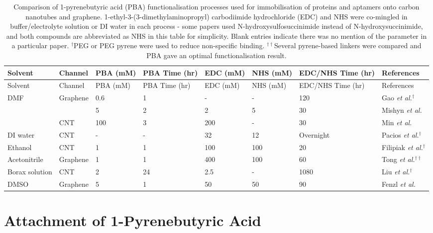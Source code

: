 \documentclass[
  a4paper,
]{scrbook}
\begin{document}
\hypertarget{tbl-pba-functionalisation}{}
\begin{longtable}[]{@{}llllllll@{}}
\caption{\label{tbl-pba-functionalisation}Comparison of 1-pyrenebutyric
acid (PBA) functionalisation processes used for immobilisation of
proteins and aptamers onto carbon nanotubes and graphene.
1-ethyl-3-(3-dimethylaminopropyl) carbodiimide hydrochloride (EDC) and
NHS were co-mingled in buffer/electrolyte solution or DI water in each
process - some papers used N-hydroxysulfosuccinimide instead of
N-hydroxysuccinimide, and both compounds are abbreviated as NHS in this
table for simplicity. Blank entries indicate there was no mention of the
parameter in a particular paper. \(^†\)PEG or PEG pyrene were used to
reduce non-specific binding. \(^{††}\)Several pyrene-based linkers were
compared and PBA gave an optimal functionalisation
result.}\tabularnewline
\toprule\noalign{}
Solvent & Channel & PBA (mM) & PBA Time (hr) & EDC (mM) & NHS (mM) &
EDC/NHS Time (hr) & References \\
\midrule\noalign{}
\endfirsthead
\toprule\noalign{}
Solvent & Channel & PBA (mM) & PBA Time (hr) & EDC (mM) & NHS (mM) &
EDC/NHS Time (hr) & References \\
\midrule\noalign{}
\endhead
\bottomrule\noalign{}
\endlastfoot
DMF & Graphene & 0.6 & 1 & - & - & 120 & Gao \textit{et al.}\(^†\)
\cite{Gao2016} \\
& & 5 & 2 & 2 & 5 & 30 & Mishyn \textit{et al.} \cite{Mishyn2022} \\
& CNT & 100 & 3 & 200 & - & 30 & Min \textit{et al.} \cite{Min2012} \\
DI water & CNT & - & - & 32 & 12 & Overnight & Pacios
\textit{et al.}\(^†\) \cite{Pacios2012} \\
Ethanol & CNT & 1 & 1 & 100 & 100 & 20 & Filipiak \textit{et al.}\(^†\)
\cite{Filipiak2018} \\
Acetonitrile & Graphene & 1 & 1 & 400 & 100 & 60 & Tong
\textit{et al.}\(^{††}\) \cite{Tong2020} \\
Borax solution & CNT & 2 & 24 & 2.5 & - & 1080 & Liu
\textit{et al.}\(^†\) \cite{Liu2011} \\
DMSO & Graphene & 5 & 1 & 50 & 50 & 90 & Fenzl \textit{et al.}
\cite{Fenzl2017} \\
\end{longtable}

\newpage
{}

\hypertarget{sec-PBA}{%
\section{Attachment of 1-Pyrenebutyric Acid}\label{sec-PBA}}
\end{document}
